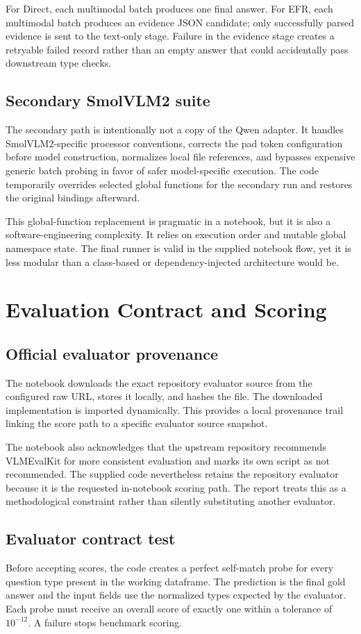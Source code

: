 \documentclass[11pt,a4paper]{article}
\begin{document}
For Direct, each multimodal batch produces one final answer. For EFR, each multimodal batch produces an evidence JSON candidate; only successfully parsed evidence is sent to the text-only stage. Failure in the evidence stage creates a retryable failed record rather than an empty answer that could accidentally pass downstream type checks.

\subsection{Secondary SmolVLM2 suite}
The secondary path is intentionally not a copy of the Qwen adapter. It handles SmolVLM2-specific processor conventions, corrects the pad token configuration before model construction, normalizes local file references, and bypasses expensive generic batch probing in favor of safer model-specific execution. The code temporarily overrides selected global functions for the secondary run and restores the original bindings afterward.

This global-function replacement is pragmatic in a notebook, but it is also a software-engineering complexity. It relies on execution order and mutable global namespace state. The final runner is valid in the supplied notebook flow, yet it is less modular than a class-based or dependency-injected architecture would be.

\section{Evaluation Contract and Scoring}
\subsection{Official evaluator provenance}
The notebook downloads the exact repository evaluator source from the configured raw URL, stores it locally, and hashes the file. The downloaded implementation is imported dynamically. This provides a local provenance trail linking the score path to a specific evaluator source snapshot.

The notebook also acknowledges that the upstream repository recommends VLMEvalKit for more consistent evaluation and marks its own script as not recommended. The supplied code nevertheless retains the repository evaluator because it is the requested in-notebook scoring path. The report treats this as a methodological constraint rather than silently substituting another evaluator.

\subsection{Evaluator contract test}
Before accepting scores, the code creates a perfect self-match probe for every question type present in the working dataframe. The prediction is the final gold answer and the input fields use the normalized types expected by the evaluator. Each probe must receive an overall score of exactly one within a tolerance of \(10^{-12}\). A failure stops benchmark scoring.
\end{document}
